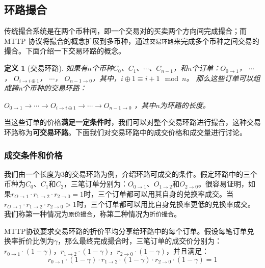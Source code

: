 \documentclass[UTF8,nofonts]{ctexart}
\newtheorem{definition}{定义}[section]
\begin{document}
\subsection{环路撮合}

传统撮合系统是在两个币种间，即一个交易对的买卖两个方向间完成撮合；而MTTP 协议将撮合的概念扩展到多币种，通过\texttt{交易环路}来完成多个币种之间交易的撮合。下面介绍一下交易环路的概念。

\begin{definition}[交易环路]
如果有$n$个币种$C_{0}$、$C_{1}$、$\cdots$、$C_{n-1}$，和$n$个订单：$O_{0\rightarrow 1}$， $\cdots$， $O_{i\rightarrow i\oplus 1}$， $\cdots$， $O_{n-1 \rightarrow 0}$，其中，$i\oplus 1 \equiv i+1 \mod n$。
那么这些订单可以组成跨n个币种的交易环路：

$O_{0\rightarrow 1} \rightarrow \cdots \rightarrow O_{i\rightarrow i\oplus 1} \rightarrow \cdots \rightarrow O_{n-1\rightarrow 0}$ ，其中$n$为环路的长度。
\end{definition}

当这些订单的价格\textbf{满足一定条件时}，我们可以对整个交易环路进行撮合，这种交易环路称为\textbf{可交易环路}。下面我们对交易环路中的成交价格和成交量进行讨论。


\subsubsection{成交条件和价格\label{sec:matchprice}}

我们由一个长度为3的交易环路为例，介绍环路可成交的条件。假定环路中的三个币种为$C_{0}$、$C_{1}$和$C_{2}$，三笔订单分别为：$O_{0\rightarrow 1}$、$O_{1 \rightarrow 2}$和$O_{2 \rightarrow 0}$。很容易证明，如果$r_{O \rightarrow 1} \cdot r_{1 \rightarrow 2}\cdot r_{2 \rightarrow 0} = 1$时，三个订单都可以用其自身的兑换率成交。当$r_{O \rightarrow 1} \cdot r_{1 \rightarrow 2}\cdot r_{2 \rightarrow 0} > 1$时，三个订单都可以用比自身兑换率更低的兑换率成交。我们称第一种情况为\texttt{原价撮合}，称第二种情况为\texttt{折价撮合}。

MTTP协议要求交易环路的折价平均分享给环路中的每个订单。假设每笔订单兑换率折价比例为$\gamma$，那么最终完成撮合时，三笔订单的成交价分别为：$r_{0\rightarrow 1} \cdot (1-\gamma)$，$r_{1\rightarrow 2} \cdot (1-\gamma)$，$r_{2 \rightarrow 0} \cdot (1-\gamma)$，并且满足：
\begin{equation}
r_{0\rightarrow 1} \cdot (1-\gamma)\cdot r_{1\rightarrow 2} \cdot (1-\gamma) \cdot r_{2 \rightarrow 0} \cdot (1-\gamma) = 1
\end{equation}
\end{document}
